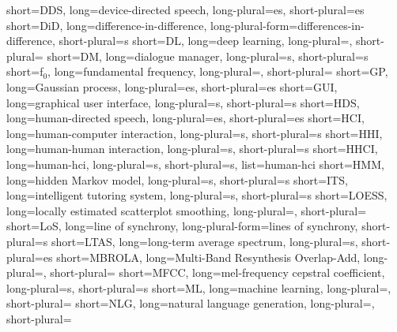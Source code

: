	{short=DDS, 	long=device-directed speech, 						long-plural=es, short-plural=es}
	{short=DiD, 	long=difference-in-difference, 						long-plural-form=differences-in-difference, short-plural=s}
		{short=DL,		long=deep learning,									long-plural=, short-plural=}
		{short=DM,		long=dialogue manager,								long-plural=s, short-plural=s}
		{short=f$_0$,	long=fundamental frequency, 						long-plural=, short-plural=}
		{short=GP,		long=Gaussian process,								long-plural=es, short-plural=es}
	{short=GUI, 	long=graphical user interface, 						long-plural=s, short-plural=s}
	{short=HDS, 	long=human-directed speech, 						long-plural=es, short-plural=es}
	{short=HCI, 	long=human-computer interaction,					long-plural=s, short-plural=s}
	{short=HHI, 	long=human-human interaction,						long-plural=s, short-plural=s}
	{short=HHCI, 	long=human-\acl*{hci},								long-plural=s, short-plural=s, list=human-\acl*{hci}}
	{short=HMM, 	long=hidden Markov model, 							long-plural=s, short-plural=s}
	{short=ITS, 	long=intelligent tutoring system, 					long-plural=s, short-plural=s}
	{short=LOESS, 	long=locally estimated scatterplot smoothing, 		long-plural=, short-plural=}
	{short=LoS, 	long=line of synchrony,								long-plural-form=lines of synchrony, short-plural=s}
	{short=LTAS, 	long=long-term average spectrum,					long-plural=s, short-plural=es}
	{short=MBROLA, 	long=Multi-Band Resynthesis Overlap-Add,			long-plural=, short-plural=}
	{short=MFCC, 	long=mel-frequency cepstral coefficient,			long-plural=s, short-plural=s}
		{short=ML, 		long=machine learning, 								long-plural=, short-plural=}
	{short=NLG, 	long=natural language generation, 					long-plural=, short-plural=}
